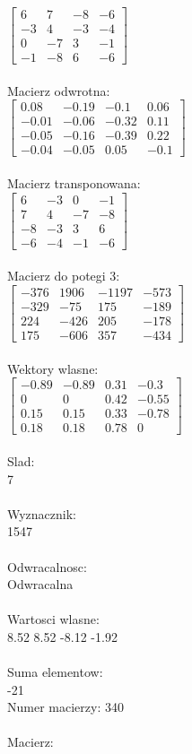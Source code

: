 \documentclass[a4paper,12pt]{article}
\begin{document}
$\begin{bmatrix} 6&7&-8&-6\\-3&4&-3&-4\\0&-7&3&-1\\-1&-8&6&-6 \end{bmatrix}$
\\
\\
Macierz odwrotna:\\

$\begin{bmatrix} 0.08&-0.19&-0.1&0.06\\-0.01&-0.06&-0.32&0.11\\-0.05&-0.16&-0.39&0.22\\-0.04&-0.05&0.05&-0.1 \end{bmatrix}$
\\
\\
Macierz transponowana:\\

$\begin{bmatrix} 6&-3&0&-1\\7&4&-7&-8\\-8&-3&3&6\\-6&-4&-1&-6 \end{bmatrix}$
\\
\\
Macierz do potegi 3:\\

$\begin{bmatrix} -376&1906&-1197&-573\\-329&-75&175&-189\\224&-426&205&-178\\175&-606&357&-434 \end{bmatrix}$
\\
\\
Wektory wlasne:\\

$\begin{bmatrix} -0.89&-0.89&0.31&-0.3\\0&0&0.42&-0.55\\0.15&0.15&0.33&-0.78\\0.18&0.18&0.78&0 \end{bmatrix}$
\\
\\
Slad:\\
7
\\
\\
Wyznacznik:\\
1547
\\
\\
Odwracalnosc:\\
Odwracalna
\\
\\
Wartosci wlasne:\\
8.52 8.52 -8.12 -1.92
\\
\\
Suma elementow:\\
-21
\\
\newpage
Numer macierzy:
340
\\
\\
Macierz:\\
\end{document}
